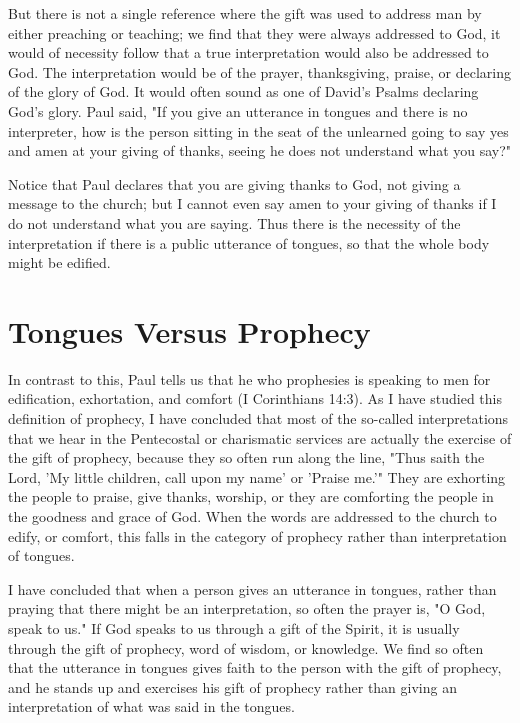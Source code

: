 But there is not a single reference where the gift was used to address man by either preaching or teaching; we find that they were always addressed to God, it would of necessity follow that a true interpretation would also be addressed to God. The interpretation would be of the prayer, thanksgiving, praise, or declaring of the glory of God. It would often sound as one of David's Psalms declaring God's glory. Paul said, "If you give an utterance in tongues and there is no interpreter, how is the person sitting in the seat of the unlearned going to say yes and amen at your giving of thanks, seeing he does not understand what you say?" 

Notice that Paul declares that you are giving thanks to God, not giving a message to the church; but I cannot even say amen to your giving of thanks if I do not understand what you are saying. Thus there is the necessity of the interpretation if there is a public utterance of tongues, so that the whole body might be edified. 

\section*{Tongues Versus Prophecy}

In contrast to this, Paul tells us that he who prophesies is speaking to men for edification, exhortation, and comfort (I Corinthians 14:3). As I have studied this definition of prophecy, I have concluded that most of the so-called interpretations that we hear in the Pentecostal or charismatic services are actually the exercise of the gift of prophecy, because they so often run along the line, "Thus saith the Lord, 'My little children, call upon my name' or 'Praise me.'" They are exhorting the people to praise, give thanks, worship, or they are comforting the people in the goodness and grace of God. When the words are addressed to the church to edify, or comfort, this falls in the category of prophecy rather than interpretation of tongues. 

I have concluded that when a person gives an utterance in tongues, rather than praying that there might be an interpretation, so often the prayer is, "O God, speak to us." If God speaks to us through a gift of the Spirit, it is usually through the gift of prophecy, word of wisdom, or knowledge. We find so often that the utterance in tongues gives faith to the person with the gift of prophecy, and he stands up and exercises his gift of prophecy rather than giving an interpretation of what was said in the tongues. 


